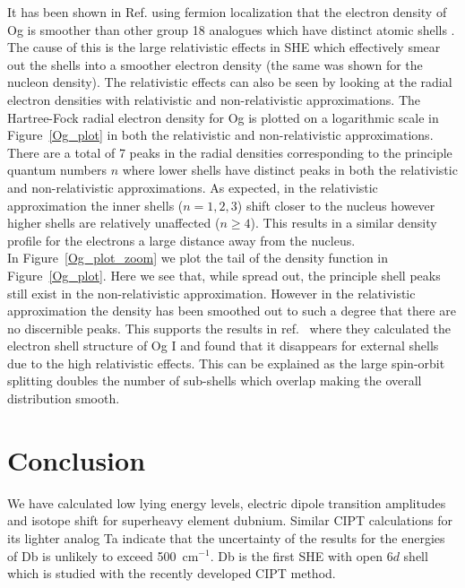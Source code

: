 \documentclass[10pt,a4paper, twoside, openright]{report}
\begin{document}
It has been shown in Ref. \cite{Jerabek2018} using fermion localization that the electron density of Og is smoother than other group 18 analogues which have distinct atomic shells . The cause of this is the large relativistic effects in SHE which effectively smear out the shells into a smoother electron density (the same was shown for the nucleon density). The relativistic effects can also be seen by looking at the radial electron densities with relativistic and non-relativistic approximations. The Hartree-Fock radial electron density for Og is plotted on a logarithmic scale in Figure~\ref{Og_plot} in both the relativistic and non-relativistic approximations. There are a total of 7 peaks in the radial densities corresponding to the principle quantum numbers $n$ where lower shells have distinct peaks in both the relativistic and non-relativistic approximations. As expected, in the relativistic approximation the inner shells ($n=1,2,3$) shift closer to the nucleus however higher shells are relatively unaffected ($n \geq 4$). This results in a similar density profile for the electrons a large distance away from the nucleus. \\

In Figure~\ref{Og_plot_zoom} we plot the tail of the density function in Figure~\ref{Og_plot}. Here we see that, while spread out, the principle shell peaks still exist in the non-relativistic approximation. However in the relativistic approximation the density has been smoothed out to such a degree that there are no discernible peaks. This supports the results in ref.~\cite{Jerabek2018} where they calculated the electron shell structure of Og I and found that it disappears for external shells due to the high relativistic effects. This can be explained as the large spin-orbit splitting doubles the number of sub-shells which overlap making the overall distribution smooth.\\

\chapter{Conclusion} \label{chap:P2Conc}
We have calculated low lying energy levels, electric dipole transition amplitudes and isotope shift for superheavy element
dubnium. Similar CIPT calculations for its lighter analog Ta indicate that the uncertainty of the results for the energies of 
Db is unlikely to exceed 500~cm$^{-1}$. Db is the first SHE with open $6d$ shell which is studied with the recently
developed CIPT method. 
\end{document}
